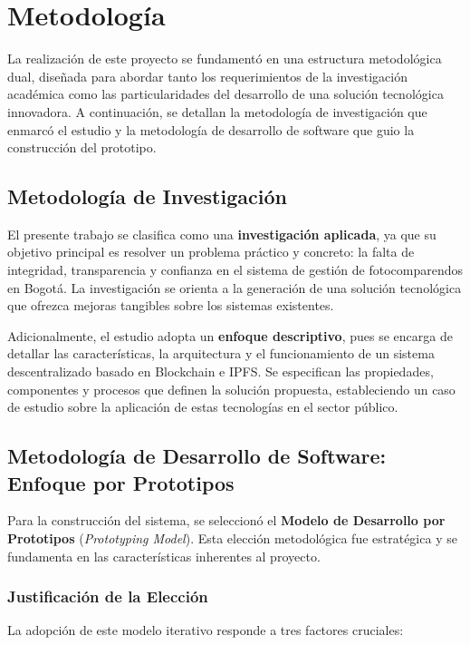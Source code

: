 \section{Metodología}

La realización de este proyecto se fundamentó en una estructura metodológica dual, diseñada para abordar tanto los requerimientos de la investigación académica como las particularidades del desarrollo de una solución tecnológica innovadora. A continuación, se detallan la metodología de investigación que enmarcó el estudio y la metodología de desarrollo de software que guio la construcción del prototipo.

\subsection{Metodología de Investigación}

El presente trabajo se clasifica como una \textbf{investigación aplicada}, ya que su objetivo principal es resolver un problema práctico y concreto: la falta de integridad, transparencia y confianza en el sistema de gestión de fotocomparendos en Bogotá. La investigación se orienta a la generación de una solución tecnológica que ofrezca mejoras tangibles sobre los sistemas existentes.

Adicionalmente, el estudio adopta un \textbf{enfoque descriptivo}, pues se encarga de detallar las características, la arquitectura y el funcionamiento de un sistema descentralizado basado en Blockchain e IPFS. Se especifican las propiedades, componentes y procesos que definen la solución propuesta, estableciendo un caso de estudio sobre la aplicación de estas tecnologías en el sector público.

\subsection{Metodología de Desarrollo de Software: Enfoque por Prototipos}

Para la construcción del sistema, se seleccionó el \textbf{Modelo de Desarrollo por Prototipos} (\textit{Prototyping Model}). Esta elección metodológica fue estratégica y se fundamenta en las características inherentes al proyecto.

\subsubsection{Justificación de la Elección}

La adopción de este modelo iterativo responde a tres factores cruciales:

